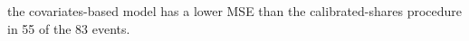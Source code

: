 the covariates-based model has a lower MSE than the calibrated-shares procedure in 55 of the 83 events.
